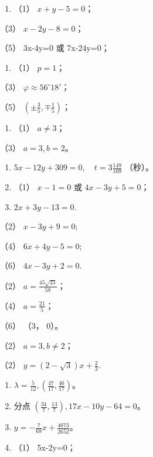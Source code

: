 \begin{enumerate}
\def\labelenumi{\arabic{enumi}.}
\setcounter{enumi}{1}
\tightlist
\item
  （1） \(x + y - 5 = 0\)；
\end{enumerate}

（3） \(x - 2y - 8 = 0\)；

（5） 3x-4y=0 或 7x-24y=0；

\begin{enumerate}
\def\labelenumi{\arabic{enumi}.}
\setcounter{enumi}{2}
\tightlist
\item
  （1） \(p = 1\)；
\end{enumerate}

（3） \(\varphi \approx 56^{\circ}18'\)；

（5） \(\left(\pm \frac{3}{5}, \mp \frac{1}{5}\right)\)；

\begin{enumerate}
\def\labelenumi{\arabic{enumi}.}
\setcounter{enumi}{3}
\tightlist
\item
  （1） \(a \neq 3\)；
\end{enumerate}

（3） \(a = 3, b = 2\)。

\begin{enumerate}
\def\labelenumi{\arabic{enumi}.}
\setcounter{enumi}{4}
\item
  \(5x-12y+309=0,\quad t=3\frac{149}{169}\) （秒）。
\item
  （1） \(x - 1 = 0\) 或 \(4x - 3y + 5 = 0\)；
\item
  \(2x + 3y - 13 = 0.\)
\end{enumerate}

（2） \(x - 3y + 9 = 0;\)

（4） \(6x + 4y - 5 = 0;\)

（6） \(4x - 3y + 2 = 0.\)

（2） \(a = \frac{45\sqrt{23}}{58}\)；

（4） \(a = \frac{21}{5}\)；

（6） （3， 0）。

（2） \(a = 3, b \neq 2\)；

（2） \(y = (2 - \sqrt{3})x + \frac{2}{3}.\)

\begin{enumerate}
\def\labelenumi{\arabic{enumi}.}
\setcounter{enumi}{8}
\item
  \(\lambda = \frac{5}{12}, \left(\frac{47}{17}, \frac{46}{17}\right)\)。
\item
  分点 \(\left(\frac{34}{7}, \frac{13}{7}\right), 17x - 10y - 64 = 0\)。
\item
  \(y = -\frac{7}{68} x + \frac{4673}{2652}\)。
\item
  （1） 5x-2y=0；
\end{enumerate}

